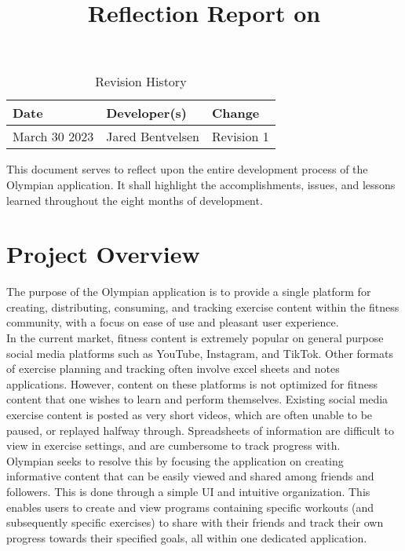 \documentclass{article}
\title{Reflection Report on \progname}
\author{\authname}
\date{}
\begin{document}
\begin{table}[hp]
\caption{Revision History} \label{TblRevisionHistory}
\begin{tabularx}{\textwidth}{llX}
\toprule
\textbf{Date} & \textbf{Developer(s)} & \textbf{Change}\\
\midrule
March 30 2023 & Jared Bentvelsen & Revision 1\\
\bottomrule
\end{tabularx}
\end{table}

\newpage

\maketitle

This document serves to reflect upon the entire development process of the Olympian application. It shall highlight the accomplishments, issues, and lessons learned throughout the eight months of development.

\section{Project Overview}


The purpose of the Olympian application is to provide a single platform for creating, distributing, consuming, and tracking exercise content within the fitness community, with a focus on ease of use and pleasant user experience.\\

In the current market, fitness content is extremely popular on general purpose social media platforms such as YouTube, Instagram, and TikTok. Other formats of exercise planning and tracking often involve excel sheets and notes applications. However, content on these platforms is not optimized for fitness content that one wishes to learn and perform themselves. Existing social media exercise content is posted as very short videos, which are often unable to be paused, or replayed halfway through. Spreadsheets of information are difficult to view in exercise settings, and are cumbersome to track progress with. \\

Olympian seeks to resolve this by focusing the application on creating informative content that can be easily viewed and shared among friends and followers. This is done through a simple UI and intuitive organization. This enables users to create and view programs containing specific workouts (and subsequently specific exercises) to share with their friends and track their own progress towards their specified goals, all within one dedicated application.
\end{document}
